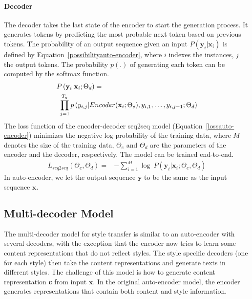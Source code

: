 \documentclass[letterpaper]{article} \usepackage{aaai18}  \usepackage{times}  \usepackage{helvet}  \usepackage{courier}  \usepackage{url}  \usepackage{graphicx}  \usepackage{amsmath}
\newcommand{\vect}[1]{\mathbf{#1}}
\newcommand{\vc}[0]{\vect{c}}
\newcommand{\vx}[0]{\vect{x}}
\newcommand{\vy}[0]{\vect{y}}
\begin{document}
\paragraph{Decoder} The decoder takes the last state of the encoder to start the generation process. 
It generates tokens by predicting the most probable next token based on previous tokens.
The probability of an output sequence given an input $P(\vy_i|\vx_i)$ is defined by Equation~\ref{possibilityauto-encoder}, 
where $i$ indexes the instances, $j$ the output tokens. 
The probability $p(.)$ of generating each token can be computed by the softmax function.
{\small
\begin{align}
	&P \left(\vy_i|\vx_i; \Theta_d \right) =            \notag \\
     &~ \prod_{j=1}^{T_y}p\left ( y_{i,j}|Encoder(\vx_i; \Theta_e),y_{i,1},\dots,y_{i,j-1};\Theta_d \right )          \label{possibilityauto-encoder}
\end{align}
}The loss function of the encoder-decoder seq2seq model (Equation~\ref{lossauto-encoder}) minimizes the negative log probability of the training data, 
where $M$ denotes the size of the training data, 
$\Theta_e$ and $\Theta_d$ are the parameters of the encoder and the decoder, respectively. The model can be trained end-to-end.
{\small
\begin{align}
	L_{seq2seq} \left( \Theta_e,\Theta_d \right) =& -\sum_{i=1}^{M}\log~P\left(\vy_i|\vx_i;\Theta_e,\Theta_d \right)  \label{lossauto-encoder}
\end{align}
}In auto-encoder, we let the output sequence $\vy$ to be the same as the input sequence $\vx$.

\subsection{Multi-decoder Model}
The multi-decoder model for style transfer is similar to an auto-encoder with several decoders, with the 
exception that the encoder now tries to learn some content representations that do not reflect styles. 
The style specific decoders (one for each style) then take the content representations and generate 
texts in different styles. The challenge of this model is how to generate content representation $\vc$ from input $\vx$. 
In the original auto-encoder model, the encoder generates representations that contain both content and style information.
\end{document}
